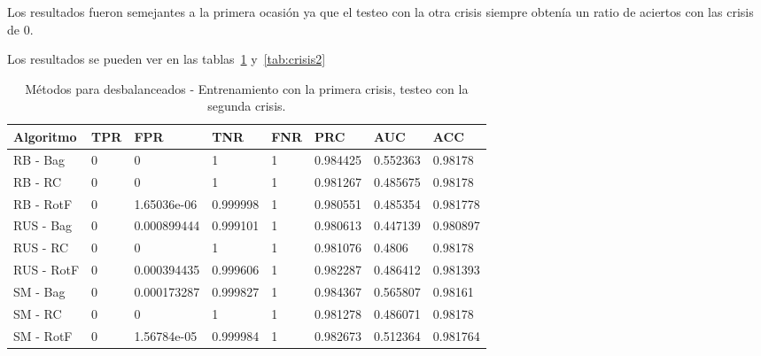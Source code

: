 Los resultados fueron semejantes a la primera ocasión ya que el testeo con la otra crisis siempre obtenía un ratio de aciertos con las crisis de 0.

Los resultados se pueden ver en las tablas~\ref{tab:crisis1} y~\ref{tab:crisis2}

\begin{table}\scriptsize
	\begin{center}
		\begin{tabular}{llllllll}
			\toprule
			Algoritmo & TPR &          FPR &       TNR & FNR &       PRC &       AUC &       ACC \\
			\midrule
			RB - Bag                &   0 &            0 &         1 &   1 &  0.984425 &  0.552363 &   0.98178 \\
			RB - RC       &   0 &            0 &         1 &   1 &  0.981267 &  0.485675 &   0.98178 \\
			RB - RotF        &   0 &  1.65036e-06 &  0.999998 &   1 &  0.980551 &  0.485354 &  0.981778 \\
			RUS - Bag          &   0 &  0.000899444 &  0.999101 &   1 &  0.980613 &  0.447139 &  0.980897 \\
			RUS - RC &   0 &            0 &         1 &   1 &  0.981076 &    0.4806 &   0.98178 \\
			RUS - RotF  &   0 &  0.000394435 &  0.999606 &   1 &  0.982287 &  0.486412 &  0.981393 \\
			SM - Bag                         &   0 &  0.000173287 &  0.999827 &   1 &  0.984367 &  0.565807 &   0.98161 \\
			SM - RC                &   0 &            0 &         1 &   1 &  0.981278 &  0.486071 &   0.98178 \\
			SM - RotF                 &   0 &  1.56784e-05 &  0.999984 &   1 &  0.982673 &  0.512364 &  0.981764 \\
			\bottomrule
		\end{tabular}
		\caption{Métodos para desbalanceados - Entrenamiento con la primera crisis, testeo con la segunda crisis.}
		\label{tab:crisis1}
	\end{center}
\end{table}

